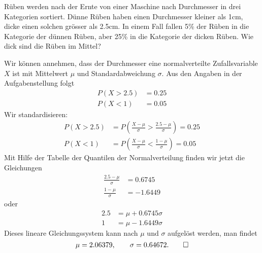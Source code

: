 Rüben werden nach der Ernte von einer Maschine nach Durchmesser
in drei Kategorien sortiert. Dünne Rüben haben einen Durchmesser
kleiner als 1cm, dicke einen solchen grösser als 2.5cm. In einem
Fall fallen 5\% der Rüben in die Kategorie der dünnen Rüben,
aber 25\% in die Kategorie der dicken Rüben. Wie dick sind
die Rüben im Mittel?


\begin{loesung}
Wir können annehmen, dass der Durchmesser eine normalverteilte
Zufallsvariable $X$ ist
mit Mittelwert $\mu$ und Standardabweichung $\sigma$. Aus den
Angaben in der Aufgabenstellung folgt
\begin{align*}
P(X>2.5)&= 0.25\\
P(X<1)&= 0.05
\end{align*}
Wir standardisieren:
\begin{align*}
P(X>2.5)&=P\left(
\frac{X-\mu}{\sigma}>\frac{2.5-\mu}{\sigma}
\right)=0.25
\\
P(X<1)&=P\left(
\frac{X-\mu}{\sigma}<\frac{1-\mu}{\sigma}
\right)=0.05
\end{align*}
Mit Hilfe der Tabelle der Quantilen der Normalverteilung finden
wir jetzt die Gleichungen
\begin{align*}
\frac{2.5-\mu}{\sigma}&=0.6745
\\
\frac{1-\mu}{\sigma}&=-1.6449
\end{align*}
oder
\begin{align*}
2.5&=\mu+0.6745\sigma\\
1&=\mu-1.6449\sigma
\end{align*}
Dieses lineare Gleichungssystem kann nach $\mu$ und $\sigma$ aufgelöst
werden, man findet
\[
\mu=2.06379,\qquad
\sigma=0.64672.
\qedhere
\]
\end{loesung}

